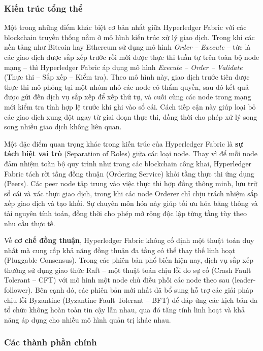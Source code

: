 \subsubsection{Kiến trúc tổng thể}

Một trong những điểm khác biệt cơ bản nhất giữa Hyperledger Fabric với các blockchain truyền thống nằm ở mô hình kiến trúc xử lý giao dịch. Trong khi các nền tảng như Bitcoin hay Ethereum sử dụng mô hình \textit{Order -- Execute} -- tức là các giao dịch được sắp xếp trước rồi mới được thực thi tuần tự trên toàn bộ node mạng -- thì Hyperledger Fabric áp dụng mô hình \textit{Execute -- Order -- Validate} (Thực thi -- Sắp xếp -- Kiểm tra). Theo mô hình này, giao dịch trước tiên được thực thi mô phỏng tại một nhóm nhỏ các node có thẩm quyền, sau đó kết quả được gửi đến dịch vụ sắp xếp để xếp thứ tự, và cuối cùng các node trong mạng mới kiểm tra tính hợp lệ trước khi ghi vào sổ cái. Cách tiếp cận này giúp loại bỏ các giao dịch xung đột ngay từ giai đoạn thực thi, đồng thời cho phép xử lý song song nhiều giao dịch không liên quan.

Một đặc điểm quan trọng khác trong kiến trúc của Hyperledger Fabric là \textbf{sự tách biệt vai trò} (Separation of Roles) giữa các loại node. Thay vì để mỗi node đảm nhiệm toàn bộ quy trình như trong các blockchain công khai, Hyperledger Fabric tách rời tầng đồng thuận (Ordering Service) khỏi tầng thực thi ứng dụng (Peers). Các peer node tập trung vào việc thực thi hợp đồng thông minh, lưu trữ sổ cái và xác thực giao dịch, trong khi các node Orderer chỉ chịu trách nhiệm sắp xếp giao dịch và tạo khối. Sự chuyên môn hóa này giúp tối ưu hóa băng thông và tài nguyên tính toán, đồng thời cho phép mở rộng độc lập từng tầng tùy theo nhu cầu thực tế.

Về \textbf{cơ chế đồng thuận}, Hyperledger Fabric không cố định một thuật toán duy nhất mà cung cấp khả năng đồng thuận đa tầng có thể thay thế linh hoạt (Pluggable Consensus). Trong các phiên bản phổ biến hiện nay, dịch vụ sắp xếp thường sử dụng giao thức Raft -- một thuật toán chịu lỗi do sự cố (Crash Fault Tolerant -- CFT) với mô hình một node chủ điều phối các node theo sau (leader-follower). Bên cạnh đó, các phiên bản mới nhất đã bổ sung hỗ trợ các giải pháp chịu lỗi Byzantine (Byzantine Fault Tolerant -- BFT) để đáp ứng các kịch bản đa tổ chức không hoàn toàn tin cậy lẫn nhau, qua đó tăng tính linh hoạt và khả năng áp dụng cho nhiều mô hình quản trị khác nhau.

\subsubsection{Các thành phần chính}

